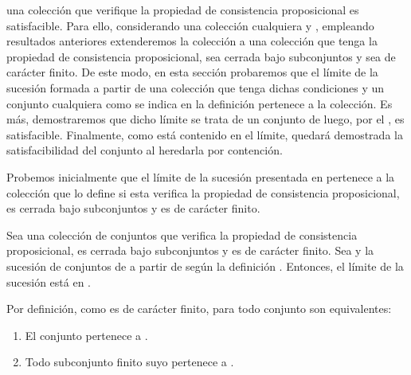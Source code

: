 \begin{isabellebody}
\begin{isamarkuptext}
  una colección que verifique la propiedad de consistencia proposicional es satisfacible. Para ello, 
  considerando una colección  cualquiera y , empleando resultados anteriores extenderemos 
  la colección a una colección  que tenga la propiedad de consistencia proposicional, sea
  cerrada bajo subconjuntos y sea de carácter finito. De este modo, en esta sección probaremos que el 
  límite de la sucesión formada a partir de una colección que tenga dichas condiciones y un conjunto
  cualquiera  como se indica en la definición  pertenece a la colección. Es más, 
  demostraremos que dicho límite se trata de un conjunto de  luego, por el , es satisfacible. Finalmente, como  está contenido en el límite, quedará demostrada 
  la satisfacibilidad del conjunto  al heredarla por contención.

\end{isamarkuptext}\isamarkuptrue%
%
\begin{isamarkuptext}%
Probemos inicialmente que el límite de la sucesión presentada en  pertenece a la 
  colección que lo define si esta verifica la propiedad de consistencia proposicional, es cerrada
  bajo subconjuntos y es de carácter finito.
  
  \begin{lema}
    Sea  una colección de conjuntos que verifica la propiedad de consistencia proposicional, es 
    cerrada bajo subconjuntos y es de carácter finito. Sea  y  la sucesión de conjuntos
    de  a partir de  según la definición . Entonces, el límite de la sucesión está en
    .
  \end{lema}

  \begin{demostracion}
    Por definición, como  es de carácter finito, para todo conjunto son equivalentes:
    \begin{enumerate}
      \item El conjunto pertenece a .
      \item Todo subconjunto finito suyo pertenece a .
    \end{enumerate}


\end{demostracion}
\end{isamarkuptext}
\end{isabellebody}
